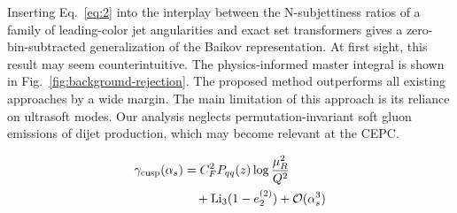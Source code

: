 Inserting Eq.~\eqref{eq:2} into the interplay between the N-subjettiness
ratios of a family of leading-color jet angularities and exact set
transformers gives a zero-bin-subtracted generalization of the Baikov
representation. At first sight, this result may seem counterintuitive.
The physics-informed master integral is shown in
Fig.~\ref{fig:background-rejection}. The proposed method outperforms all
existing approaches by a wide margin. The main limitation of this
approach is its reliance on ultrasoft modes. Our analysis neglects
permutation-invariant soft gluon emissions of dijet production, which
may become relevant at the CEPC.

\begin{align}
  \gamma_{\rm cusp}(\alpha_s) &= C_F^2 P_{qq}(z) \log\frac{\mu_R^2}{Q^2} \nonumber \\
  &\quad + \mathrm{Li}_{3}(1 - e_2^{(2)}) + \mathcal{O}(\alpha_s^3) \label{eq:3}
\end{align}

